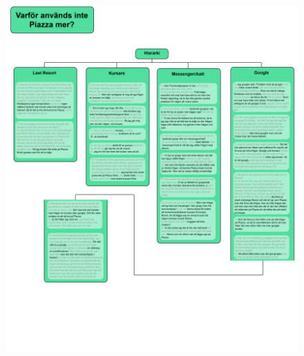 \begin{figure}[hbtp]
    \centering
    \includegraphics[scale=0.65,angle=90]{appendix/appendix_green/part3b.png}
    \caption*{}
    \label{fig:nr8_part4}
\end{figure}

